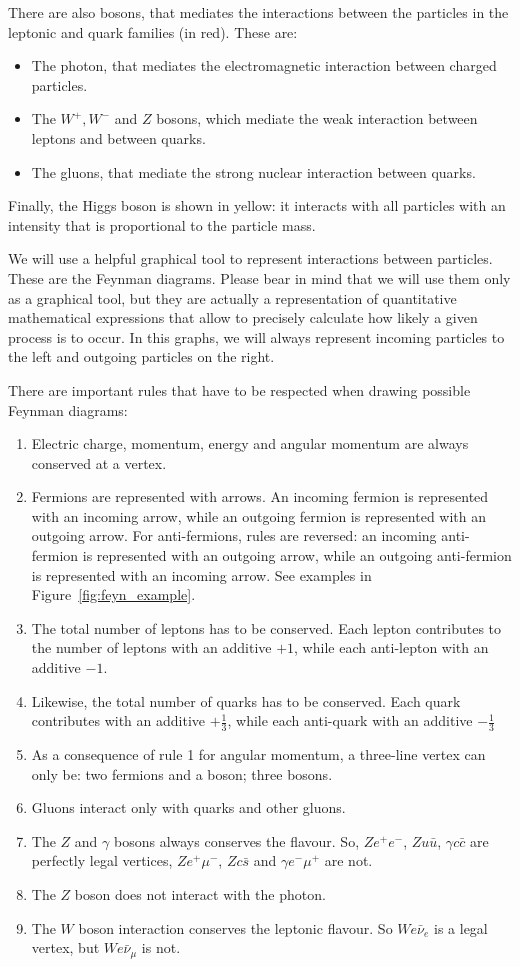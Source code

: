 There are also bosons, that mediates the interactions between the particles in the leptonic and quark families (in red). These are: 
\begin{itemize}
\item The photon, that mediates the electromagnetic interaction between charged particles. 
\item The $W^+, W^{-}$ and $Z$ bosons, which mediate the weak interaction between leptons and between quarks. 
\item The gluons, that mediate the strong nuclear interaction between quarks. 
\end{itemize} 

Finally, the Higgs boson is shown in yellow: it interacts with all particles with an intensity that is proportional to the particle mass. 

We will use a helpful graphical tool to represent interactions between particles. These are the Feynman diagrams. Please bear in mind that we will use them only as a graphical tool, but they are actually a representation of quantitative mathematical expressions that allow to precisely calculate how likely a given process is to occur. In this graphs, we will always represent incoming particles to the left and outgoing particles on the right. 

There are important rules that have to be respected when drawing possible Feynman diagrams:
\begin{enumerate}
\item Electric charge, momentum, energy and angular momentum are always conserved at a vertex.
\item Fermions are represented with arrows. An incoming fermion is represented with an incoming arrow, while an outgoing fermion is represented with an outgoing arrow. For anti-fermions, rules are reversed: an incoming anti-fermion is represented with an outgoing arrow, while an outgoing anti-fermion is represented with an incoming arrow. See examples in Figure~\ref{fig:feyn_example}. 
\item The total number of leptons has to be conserved. Each lepton contributes to the number of leptons with an additive $+1$, while each anti-lepton with an additive $-1$.
\item Likewise, the total number of quarks has to be conserved. Each quark contributes with an additive $+\frac{1}{3}$, while each anti-quark with an additive $-\frac{1}{3}$
\item As a consequence of rule 1 for angular momentum, a three-line vertex can only be: two fermions and a boson; three bosons.
\item Gluons interact only with quarks and other gluons. 
\item The $Z$ and $\gamma$ bosons always conserves the flavour. So, $Ze^+e^-$, $Zu\bar{u}$, $\gamma c\bar{c}$ are perfectly legal vertices, $Z e^+ \mu^{-}$, $Zc\bar{s}$ and $\gamma e^-\mu^+$ are not.
\item The $Z$ boson does not interact with the photon.
\item The $W$ boson interaction conserves the leptonic flavour. So $We\bar{\nu}_e$ is a legal vertex, but $We\bar{\nu}_{\mu}$ is not. 
\end{enumerate}

